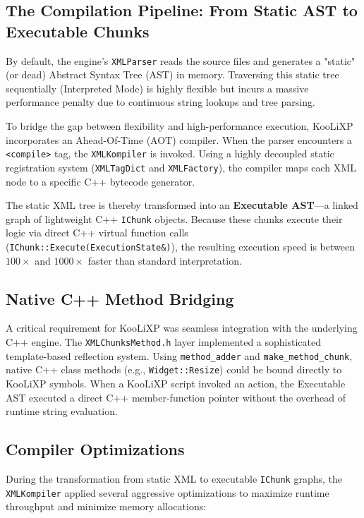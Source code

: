 \documentclass[11pt, a4paper]{article}
\begin{document}
\subsection{The Compilation Pipeline: From Static AST to Executable Chunks}
By default, the engine's \texttt{XMLParser} reads the source files and generates a "static" (or dead) Abstract Syntax Tree (AST) in memory. Traversing this static tree sequentially (Interpreted Mode) is highly flexible but incurs a massive performance penalty due to continuous string lookups and tree parsing.

To bridge the gap between flexibility and high-performance execution, KooLiXP incorporates an Ahead-Of-Time (AOT) compiler. When the parser encounters a \texttt{<compile>} tag, the \texttt{XMLKompiler} is invoked. Using a highly decoupled static registration system (\texttt{XMLTagDict} and \texttt{XMLFactory}), the compiler maps each XML node to a specific C++ bytecode generator. 



The static XML tree is thereby transformed into an \textbf{Executable AST}---a linked graph of lightweight C++ \texttt{IChunk} objects. Because these chunks execute their logic via direct C++ virtual function calls (\texttt{IChunk::Execute(ExecutionState\&)}), the resulting execution speed is between $100\times$ and $1000\times$ faster than standard interpretation.

\subsection{Native C++ Method Bridging}
A critical requirement for KooLiXP was seamless integration with the underlying C++ engine. The \texttt{XMLChunksMethod.h} layer implemented a sophisticated template-based reflection system. Using \texttt{method\_adder} and \texttt{make\_method\_chunk}, native C++ class methods (e.g., \texttt{Widget::Resize}) could be bound directly to KooLiXP symbols. When a KooLiXP script invoked an action, the Executable AST executed a direct C++ member-function pointer without the overhead of runtime string evaluation.

\subsection{Compiler Optimizations}
During the transformation from static XML to executable \texttt{IChunk} graphs, the \texttt{XMLKompiler} applied several aggressive optimizations to maximize runtime throughput and minimize memory allocations:
\end{document}
